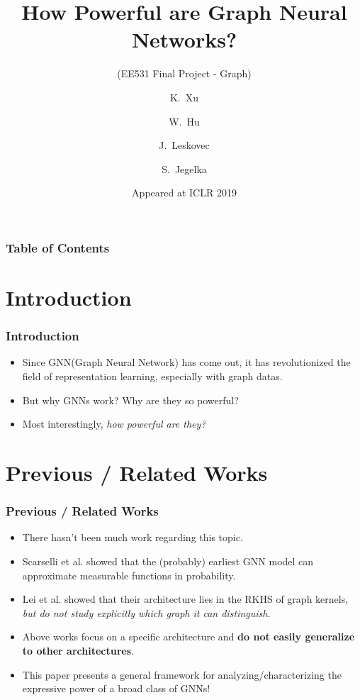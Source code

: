 \documentclass{beamer}
\title[How Powerful are Graph Neural Networks?]
{How Powerful are Graph Neural Networks?}
\subtitle{(EE531 Final Project - Graph)}
\author[Junghyun Lee]
{K.~Xu\inst{1} \and W.~Hu\inst{2} \and J.~Leskovec\inst{2} \and S.~Jegelka\inst{1}}
\institute[KAIST]
{
	\inst{1}%
	MIT
	
	\inst{2}%
	Stanford University
}
\date[ICLR 2019]
{Appeared at ICLR 2019}
\begin{document}
\frame{\titlepage}


\begin{frame}
\frametitle{Table of Contents}
\tableofcontents
\end{frame}

\section{Introduction}

\begin{frame}
\frametitle{Introduction}

\begin{itemize}
    \item Since GNN(Graph Neural Network) has come out, it has revolutionized the field of representation learning, especially with graph datas. \pause
    \item But why GNNs work? Why are they so powerful? \pause
    \item Most interestingly, {\it how powerful are they?}
\end{itemize}
\end{frame}


\section{Previous / Related Works}

\begin{frame}
\frametitle{Previous / Related Works}

\begin{itemize}
    \item There hasn't been much work regarding this topic.\pause
    \item Scarselli et al. showed that the (probably) earliest GNN model can approximate measurable functions in probability.\pause
    \item Lei et al. showed that their architecture lies in the RKHS of graph kernels, {\it but do not study explicitly which graph it can distinguish.}\pause
    \item Above works focus on a specific architecture and {\bf do not easily generalize to other architectures}.\pause
    \item This paper presents a \alert{general framework} for analyzing/characterizing the expressive power of a \alert{broad class of GNNs}!
\end{itemize}
\end{frame}
\end{document}
